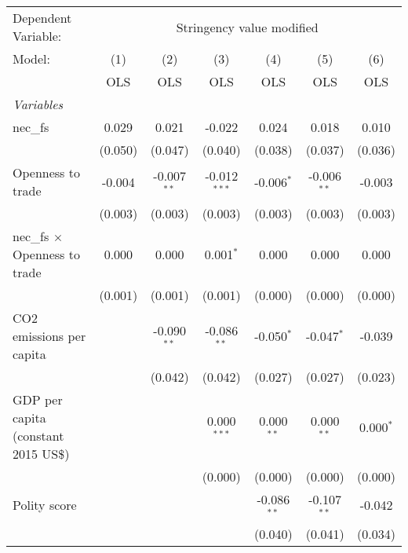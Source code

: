 
\begingroup
\centering
\begin{tabular}{lcccccc}
   \toprule
   Dependent Variable: & \multicolumn{6}{c}{Stringency value modified}\\
   Model:                               & (1)     & (2)           & (3)            & (4)           & (5)           & (6)\\  
                                        &  OLS    & OLS           & OLS            & OLS           & OLS           & OLS\\  
   \midrule
   \emph{Variables}\\
   nec\_fs                              & 0.029   & 0.021         & -0.022         & 0.024         & 0.018         & 0.010\\   
                                        & (0.050) & (0.047)       & (0.040)        & (0.038)       & (0.037)       & (0.036)\\   
   Openness to trade                    & -0.004  & -0.007$^{**}$ & -0.012$^{***}$ & -0.006$^{*}$  & -0.006$^{**}$ & -0.003\\   
                                        & (0.003) & (0.003)       & (0.003)        & (0.003)       & (0.003)       & (0.003)\\   
   nec\_fs $\times$ Openness to trade   & 0.000   & 0.000         & 0.001$^{*}$    & 0.000         & 0.000         & 0.000\\   
                                        & (0.001) & (0.001)       & (0.001)        & (0.000)       & (0.000)       & (0.000)\\   
   CO2 emissions per capita             &         & -0.090$^{**}$ & -0.086$^{**}$  & -0.050$^{*}$  & -0.047$^{*}$  & -0.039\\   
                                        &         & (0.042)       & (0.042)        & (0.027)       & (0.027)       & (0.023)\\   
   GDP per capita (constant 2015 US\$)  &         &               & 0.000$^{***}$  & 0.000$^{**}$  & 0.000$^{**}$  & 0.000$^{*}$\\   
                                        &         &               & (0.000)        & (0.000)       & (0.000)       & (0.000)\\   
   Polity score                         &         &               &                & -0.086$^{**}$ & -0.107$^{**}$ & -0.042\\   
                                        &         &               &                & (0.040)       & (0.041)       & (0.034)\\   

\end{tabular}

